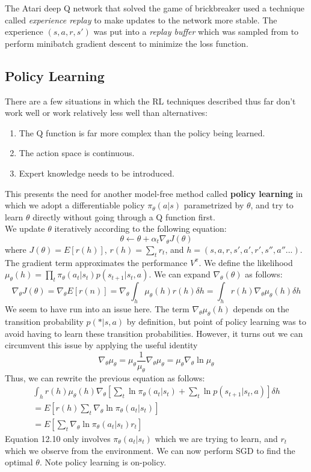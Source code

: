 The Atari deep Q network that solved the game of brickbreaker used a technique called \textit{experience replay} to make updates to the network more stable. The experience $(s, a, r, s')$ was put into a \textit{replay buffer} which was sampled from to perform minibatch gradient descent to minimize the loss function.
\subsection{Policy Learning}
There are a few situations in which the RL techniques described thus far don't work well or work relatively less well than alternatives:
\begin{enumerate}
    \item The Q function is far more complex than the policy being learned.
    \item The action space is continuous.
    \item Expert knowledge needs to be introduced.
\end{enumerate}
This presents the need for another model-free method called \textbf{policy learning} in which we adopt a differentiable policy $\pi_\theta(a|s)$ parametrized by $\theta$, and try to learn $\theta$ directly without going through a Q function first.\\
We update $\theta$ iteratively according to the following equation:
\begin{equation*}
    \theta \leftarrow \theta + \alpha_t \nabla_\theta J(\theta)
\end{equation*}
where $J(\theta) = E[r(h)]$, $r(h) = \sum_tr_t$, and $h = (s, a, r, s', a', r', s'', a''...)$. The gradient term approximates the performance $V^{\pi}$. We define the likelihood $\mu_\theta(h) = \prod_t\pi_\theta(a_t|s_t)p(s_{t+1}|s_t, a)$. We can expand $\nabla_\theta(\theta)$ as follows:
\begin{equation}
    \nabla_\theta J(\theta) = \nabla_\theta E[r(n)] = \nabla_\theta\int_h\mu_\theta(h)r(h)\delta h = \int_hr(h)\nabla_\theta\mu_\theta(h)\delta h
\end{equation}
We seem to have run into an issue here. The term $\nabla_\theta\mu_\theta(h)$ depends on the transition probability $p(*|s, a)$ by definition, but point of policy learning was to avoid having to learn these transition probabilities. However, it turns out we can circumvent this issue by applying the useful identity
\begin{equation}
    \nabla_\theta\mu_\theta = \mu_\theta\frac{1}{\mu_\theta}\nabla_\theta\mu_\theta = \mu_\theta\nabla_\theta\ln\mu_\theta
\end{equation}
Thus, we can rewrite the previous equation as follows:
\begin{align}
    \int_hr(h)\mu_\theta(h)\nabla_\theta\left[\sum_t\ln\pi_\theta(a_t|s_t) + \sum_t\ln p(s_{t+1}|s_t, a)\right]\delta h\\
    = E\left[r(h)\sum_t\nabla_\theta\ln\pi_\theta(a_t|s_t)\right]\\
    = E\left[\sum_t\nabla_\theta\ln\pi_\theta(a_t|s_t)r_t\right]
\end{align}
Equation 12.10 only involves $\pi_\theta(a_t|s_t)$ which we are trying to learn, and $r_t$ which we observe from the environment. We can now perform SGD to find the optimal $\theta$. Note policy learning is on-policy.

